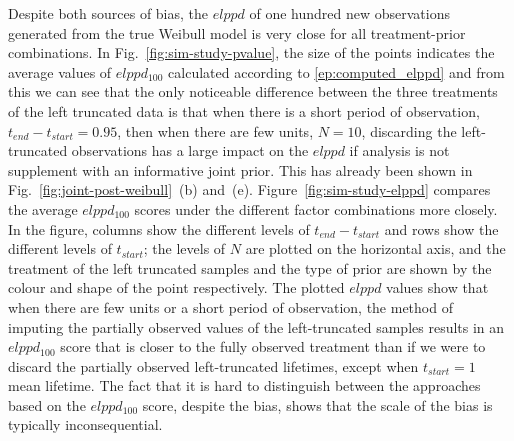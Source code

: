 Despite both sources of bias, the $elppd$ of one hundred new observations generated from the true Weibull model is very close for all treatment-prior combinations. In Fig.~\ref{fig:sim-study-pvalue}, the size of the points indicates the average values of $elppd_{100}$ calculated according to \eqref{ep:computed_elppd} and from this we can see that the only noticeable difference between the three treatments of the left truncated data is that when there is a short period of observation,  $t_{end} - t_{start} = 0.95$, then when there are few units, $N = 10$, discarding the left-truncated observations has a large impact on the $elppd$ if analysis is not supplement with an informative joint prior. This has already been shown in Fig.~\ref{fig:joint-post-weibull}~(b) and~(e). Figure~\ref{fig:sim-study-elppd} compares the average $elppd_{100}$ scores under the different factor combinations more closely. In the figure, columns show the different levels of $t_{end} - t_{start}$ and rows show the different levels of $t_{start}$; the levels of $N$ are plotted on the horizontal axis, and the treatment of the left truncated samples and the type of prior are shown by the colour and shape of the point respectively. The plotted $elppd$ values show that when there are few units or a short period of observation, the method of imputing the partially observed values of the left-truncated samples results in an $elppd_{100}$ score that is closer to the fully observed treatment than if we were to discard the partially observed left-truncated lifetimes, except when $t_{start} = 1$ mean lifetime. The fact that it is hard to distinguish between the approaches based on the $elppd_{100}$ score, despite the bias, shows that the scale of the bias is typically inconsequential.

